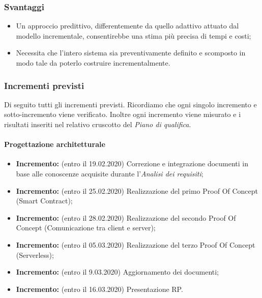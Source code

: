 \subsubsection{Svantaggi}
\begin{itemize}
	\item Un approccio predittivo, differentemente da quello adattivo attuato dal modello incrementale, consentirebbe una stima più precisa di tempi e costi;
	\item Necessita che l'intero sistema sia preventivamente definito e scomposto in modo tale da poterlo costruire incrementalmente.
\end{itemize}
\subsubsection{Incrementi previsti}
Di seguito tutti gli incrementi previsti. Ricordiamo che ogni singolo incremento e sotto-incremento viene verificato. Inoltre ogni incremento viene misurato e i risultati inseriti nel relativo cruscotto del \textit{Piano di qualifica}\docs.
\paragraph{Progettazione architetturale}
\begin{itemize}
  \item \textbf{ Incremento:} (entro il 19.02.2020) Correzione e integrazione documenti in base alle conoscenze acquisite durante l'\textit{Analisi dei requisiti}\docs;
  \item \textbf{ Incremento:} (entro il 25.02.2020) Realizzazione del primo Proof Of Concept (Smart Contract);
  \item \textbf{ Incremento:} (entro il 28.02.2020) Realizzazione del secondo Proof Of Concept (Comunicazione tra client e server);
  \item \textbf{ Incremento:} (entro il 05.03.2020) Realizzazione del terzo Proof Of Concept (Serverless);
  \item \textbf{ Incremento:} (entro il 9.03.2020) Aggiornamento dei documenti;
  \item \textbf{ Incremento:} (entro il 16.03.2020) Presentazione RP.
\end{itemize}

